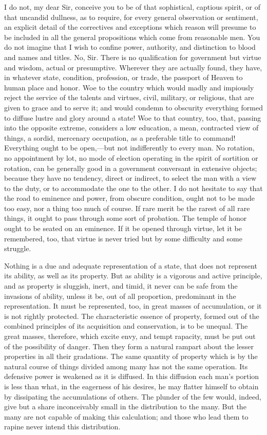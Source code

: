 I do not, my dear Sir, conceive you to be of that sophistical, captious spirit, or of that uncandid dullness, as to require, for every general observation or sentiment, an explicit detail of the correctives and exceptions which reason will presume to be included in all the general propositions which come from reasonable men. You do not imagine that I wish to confine power, authority, and distinction to blood and names and titles. No, Sir. There is no qualification for government but virtue and wisdom, actual or presumptive. Wherever they are actually found, they have, in whatever state, condition, profession, or trade, the passport of Heaven to human place and honor. Woe to the country which would madly and impiously reject the service of the talents and virtues, civil, military, or religious, that are given to grace and to serve it; and would condemn to obscurity everything formed to diffuse lustre and glory around a state! Woe to that country, too, that, passing into the opposite extreme, considers a low education, a mean, contracted view of things, a sordid, mercenary occupation, as a preferable title to command! Everything ought to be open,—but not indifferently to every man. No rotation, no appointment by lot, no mode of election operating in the spirit of sortition or rotation, can be generally good in a government conversant in extensive objects; because they have no tendency, direct or indirect, to select the man with a view to the duty, or to accommodate the one to the other. I do not hesitate to say that the road to eminence and power, from obscure condition, ought not to be made too easy, nor a thing too much of course. If rare merit be the rarest of all rare things, it ought to pass through some sort of probation. The temple of honor ought to be seated on an eminence. If it be opened through virtue, let it be remembered, too, that virtue is never tried but by some difficulty and some struggle.

Nothing is a due and adequate representation of a state, that does not represent its ability, as well as its property. But as ability is a vigorous and active principle, and as property is sluggish, inert, and timid, it never can be safe from the invasions of ability, unless it be, out of all proportion, predominant in the representation. It must be represented, too, in great masses of accumulation, or it is not rightly protected. The characteristic essence of property, formed out of the combined principles of its acquisition and conservation, is to be unequal. The great masses, therefore, which excite envy, and tempt rapacity, must be put out of the possibility of danger. Then they form a natural rampart about the lesser properties in all their gradations. The same quantity of property which is by the natural course of things divided among many has not the same operation. Its defensive power is weakened as it is diffused. In this diffusion each man's portion is less than what, in the eagerness of his desires, he may flatter himself to obtain by dissipating the accumulations of others. The plunder of the few would, indeed, give but a share inconceivably small in the distribution to the many. But the many are not capable of making this calculation; and those who lead them to rapine never intend this distribution.

